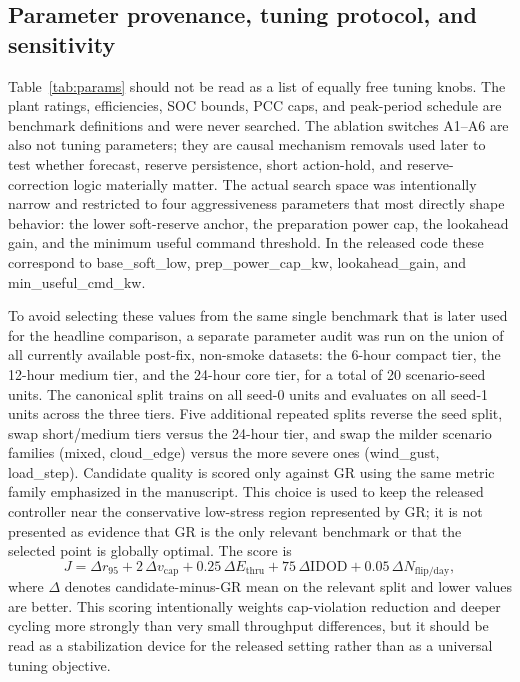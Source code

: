 \documentclass[preprint,12pt]{elsarticle}
\def\texttt#1{#1}%
\begin{document}
\subsection*{Parameter provenance, tuning protocol, and sensitivity}
Table~\ref{tab:params} should not be read as a list of equally free tuning knobs. The plant ratings, efficiencies, SOC bounds, PCC caps, and peak-period schedule are benchmark definitions and were never searched. The ablation switches A1--A6 are also not tuning parameters; they are causal mechanism removals used later to test whether forecast, reserve persistence, short action-hold, and reserve-correction logic materially matter. The actual search space was intentionally narrow and restricted to four aggressiveness parameters that most directly shape behavior: the lower soft-reserve anchor, the preparation power cap, the lookahead gain, and the minimum useful command threshold. In the released code these correspond to \texttt{base\_soft\_low}, \texttt{prep\_power\_cap\_kw}, \texttt{lookahead\_gain}, and \texttt{min\_useful\_cmd\_kw}.

To avoid selecting these values from the same single benchmark that is later used for the headline comparison, a separate parameter audit was run on the union of all currently available post-fix, non-smoke datasets: the 6-hour compact tier, the 12-hour medium tier, and the 24-hour core tier, for a total of 20 scenario-seed units. The canonical split trains on all seed-0 units and evaluates on all seed-1 units across the three tiers. Five additional repeated splits reverse the seed split, swap short/medium tiers versus the 24-hour tier, and swap the milder scenario families (\texttt{mixed}, \texttt{cloud\_edge}) versus the more severe ones (\texttt{wind\_gust}, \texttt{load\_step}). Candidate quality is scored only against GR using the same metric family emphasized in the manuscript. This choice is used to keep the released controller near the conservative low-stress region represented by GR; it is not presented as evidence that GR is the only relevant benchmark or that the selected point is globally optimal. The score is
\begin{equation}
J = \Delta r_{95} + 2\,\Delta v_{\mathrm{cap}} + 0.25\,\Delta E_{\mathrm{thru}} + 75\,\Delta \mathrm{IDOD} + 0.05\,\Delta N_{\mathrm{flip/day}},
\label{eq:param_score}
\end{equation}
where $\Delta$ denotes candidate-minus-GR mean on the relevant split and lower values are better. This scoring intentionally weights cap-violation reduction and deeper cycling more strongly than very small throughput differences, but it should be read as a stabilization device for the released setting rather than as a universal tuning objective.
\end{document}
